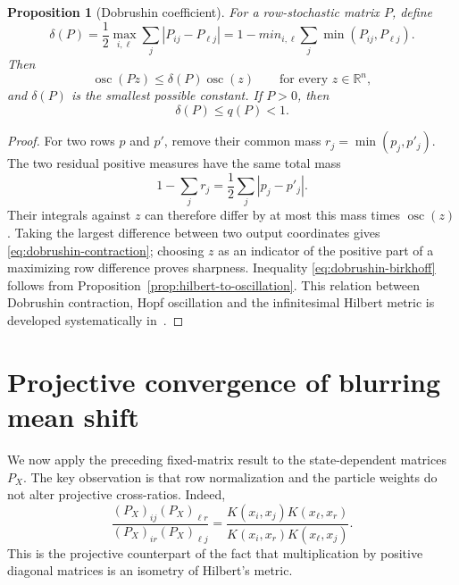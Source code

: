 \documentclass[11pt]{article}
\newtheorem{proposition}[theorem]{Proposition}
\theoremstyle{definition}
\newcommand{\R}{\mathbb{R}}
\newcommand{\osc}{\operatorname{osc}}
\begin{document}
\begin{proposition}[Dobrushin coefficient]\label{prop:dobrushin}
For a row-stochastic matrix $P$, define
\begin{equation}\label{eq:dobrushin}
  \delta(P)
  =
  \frac12\max_{i,\ell}\sum_j|P_{ij}-P_{\ell j}|
  =
  1-min_{i,\ell}\sum_j\min(P_{ij},P_{\ell j}).
\end{equation}
Then
\begin{equation}\label{eq:dobrushin-contraction}
  \osc(Pz)\leq\delta(P)\osc(z)
  \qquad\text{for every }z\in\R^n,
\end{equation}
and $\delta(P)$ is the smallest possible constant.  If $P>0$, then
\begin{equation}\label{eq:dobrushin-birkhoff}
  \delta(P)\leq q(P)<1.
\end{equation}
\end{proposition}

\begin{proof}
For two rows $p$ and $p'$, remove their common mass
$r_j=\min(p_j,p'_j)$.  The two residual positive measures have the same total
mass
\begin{equation*}
  1-\sum_jr_j=\frac12\sum_j|p_j-p'_j|.
\end{equation*}
Their integrals against $z$ can therefore differ by at most this mass times
$\osc(z)$.  Taking the largest difference between two output coordinates gives
\eqref{eq:dobrushin-contraction}; choosing $z$ as an indicator of the positive
part of a maximizing row difference proves sharpness.  Inequality
\eqref{eq:dobrushin-birkhoff} follows from
Proposition~\ref{prop:hilbert-to-oscillation}.  This relation between
Dobrushin contraction, Hopf oscillation and the infinitesimal Hilbert metric is
developed systematically in~\cite{GaubertQu2015}.
\end{proof}

\section{Projective convergence of blurring mean shift}

We now apply the preceding fixed-matrix result to the state-dependent matrices
$P_X$.  The key observation is that row normalization and the particle weights
do not alter projective cross-ratios.  Indeed,
\begin{equation}\label{eq:cross-ratio-cancellation}
  \frac{(P_X)_{ij}(P_X)_{\ell r}}
       {(P_X)_{ir}(P_X)_{\ell j}}
  =
  \frac{K(x_i,x_j)K(x_\ell,x_r)}
       {K(x_i,x_r)K(x_\ell,x_j)}.
\end{equation}
This is the projective counterpart of the fact that multiplication by positive
diagonal matrices is an isometry of Hilbert's metric.
\end{document}
